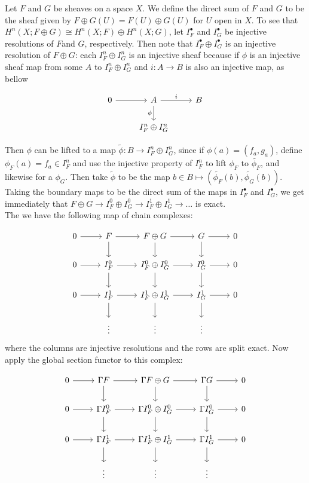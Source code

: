 \documentclass{article}
\begin{document}
\begin{enumerate}
Let $F$ and $G$ be sheaves on a space $X$. We define the direct sum of $F$ and $G$ to be the sheaf given by $F \oplus G (U) = F(U) \oplus G(U)$ for $U$ open in $X$. To see that $H^n(X;F\oplus G)\cong H^n(X;F)\oplus H^n(X;G)$, let $I^\bullet_F$ and $I^\bullet_G$ be injective resolutions of $F$and $G$, respectively. Then note that $I^\bullet_F \oplus I^\bullet_G$ is an injective resolution of $F \oplus G$: each $I^n_F \oplus I^n_G$ is an injective sheaf because if $\phi$ is an injective sheaf map from some $A$ to  $I^n_F \oplus I^n_G$  and $i:A \rightarrow B$ is also an injective map, as bellow

\[
\begin{tikzcd}
0 \arrow[r] 
& A \arrow[r, "i"] \arrow[d, "\phi"']
& B 
\\
& 
I^n_F \oplus I^n_G
\end{tikzcd}
\] 

Then $\phi$ can be lifted to a map $\tilde{\phi}:B \rightarrow  I^n_F \oplus I^n_G$, since if $\phi(a)=(f_a,g_a)$, define $\phi_F(a)=f_a \in I^n_F$ and use the injective property of $I_F^n$ to lift $\phi_F$ to $\tilde{\phi_F}$, and likewise for a $\phi_G$. Then take $\tilde{\phi}$ to be the map $b \in B \mapsto (\tilde{\phi_F}(b), \tilde{\phi_G}(b))$. Taking the boundary maps to be the direct sum of the maps in $I^\bullet_F$ and $I^\bullet_G$, we get immediately that $F \oplus G \rightarrow I^0_F \oplus I^0_G \rightarrow I^1_F \oplus I^1_G \rightarrow \ldots$ is exact.\\

The we have the following map of chain complexes:

\[
\begin{tikzcd}
0 \arrow[r]
& F  \arrow[r] \arrow[d]
& F \oplus G  \arrow[r] \arrow[d]
& G \arrow[r] \arrow[d]
& 0  
\\
0 \arrow[r] 
& I^0_F \arrow[r] \arrow[d]
& I^0_F \oplus I^0_G \arrow[r] \arrow[d]
& I^0_G \arrow[r] \arrow[d]
& 0  
\\
0 \arrow[r]  
& I^1_F \arrow[r] \arrow[d]
& I^1_F \oplus I^1_G \arrow[r] \arrow[d]
& I^1_G \arrow[r] \arrow[d]
& 0  
\\
& \vdots 
& \vdots 
& \vdots
& 
\end{tikzcd}
\]
where the columns are injective resolutions and the rows are split exact. Now apply the global section functor to this complex: 

\[
\begin{tikzcd}
0 \arrow[r]
& \Gamma F  \arrow[r] \arrow[d]
& \Gamma F \oplus G  \arrow[r] \arrow[d]
& \Gamma G \arrow[r] \arrow[d]
& 0  
\\
0 \arrow[r] 
& \Gamma I^0_F \arrow[r] \arrow[d]
& \Gamma I_F^0 \oplus I_G^0 \arrow[r] \arrow[d]
& \Gamma I^0_G \arrow[r] \arrow[d]
& 0  
\\
0 \arrow[r]  
& \Gamma I^1_F \arrow[r] \arrow[d]
& \Gamma I_F^1 \oplus I_G^1 \arrow[r] \arrow[d]
& \Gamma I^1_G \arrow[r] \arrow[d]
& 0  
\\
& \vdots 
& \vdots 
& \vdots
& 
\end{tikzcd}
\]


\end{enumerate}
\end{document}
